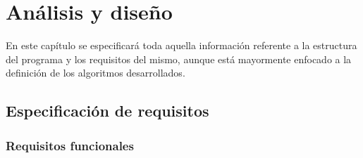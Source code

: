
\chapter{Análisis y diseño}

En este capítulo se especificará toda aquella información referente a la estructura del programa y los requisitos del mismo, aunque está mayormente enfocado a la definición de los algoritmos desarrollados.

\section{Especificación de requisitos}

	\subsection{Requisitos funcionales}
